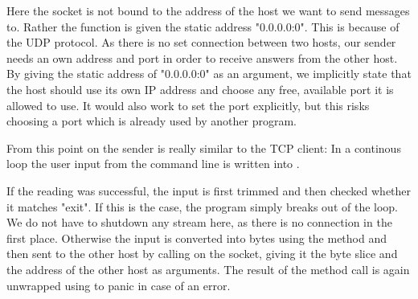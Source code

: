 Here the socket is not bound to the address of the host we want to send messages to. Rather the  function is
given the static address "0.0.0.0:0". This is because of the UDP protocol. As there is no set connection between two
hosts, our sender needs an own address and port in order to receive answers from the other host. By giving 
the static address of "0.0.0.0:0" as an argument, we implicitly state that the host should use its own IP address and
choose any free, available port it is allowed to use. It would also work to set the port explicitly, but this risks
choosing a port which is already used by another program.

From this point on the sender is really similar to the TCP client: In a continous loop the user input from the command
line is written into .

If the reading was successful, the input is first trimmed and then checked whether it
matches "exit". If this is the case, the program simply breaks out of the loop. We do not have to shutdown any stream
here, as there is no connection in the first place. Otherwise the input is converted into bytes using the method
 and then sent to the other host by calling  on the socket, giving it the byte slice and
the address of the other host as arguments. The result of the method call is again unwrapped using  to
panic in case of an error.
